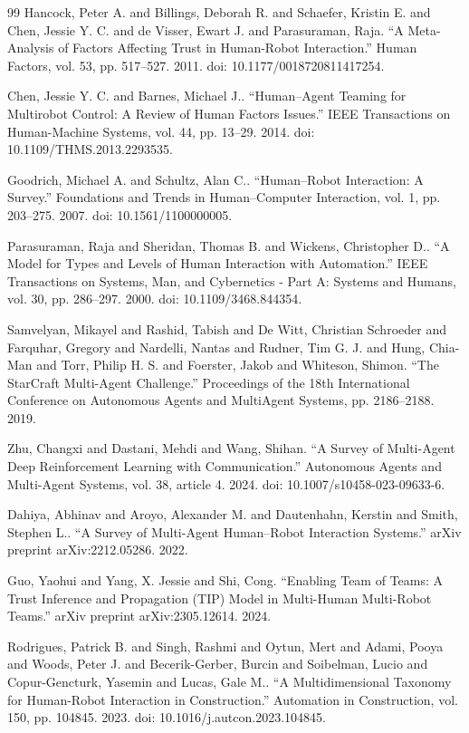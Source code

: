 \documentclass[fleqn,10pt]{wlpeerj}
\begin{document}
\begin{thebibliography}{99}
 Hancock, Peter A. and Billings, Deborah R. and Schaefer, Kristin E. and Chen, Jessie Y. C. and de Visser, Ewart J. and Parasuraman, Raja. ``A Meta-Analysis of Factors Affecting Trust in Human-Robot Interaction.'' Human Factors, vol. 53, pp. 517--527. 2011. doi: 10.1177/0018720811417254.

 Chen, Jessie Y. C. and Barnes, Michael J.. ``Human--Agent Teaming for Multirobot Control: A Review of Human Factors Issues.'' IEEE Transactions on Human-Machine Systems, vol. 44, pp. 13--29. 2014. doi: 10.1109/THMS.2013.2293535.

 Goodrich, Michael A. and Schultz, Alan C.. ``Human--Robot Interaction: A Survey.'' Foundations and Trends in Human--Computer Interaction, vol. 1, pp. 203--275. 2007. doi: 10.1561/1100000005.

 Parasuraman, Raja and Sheridan, Thomas B. and Wickens, Christopher D.. ``A Model for Types and Levels of Human Interaction with Automation.'' IEEE Transactions on Systems, Man, and Cybernetics - Part A: Systems and Humans, vol. 30, pp. 286--297. 2000. doi: 10.1109/3468.844354.

 Samvelyan, Mikayel and Rashid, Tabish and De Witt, Christian Schroeder and Farquhar, Gregory and Nardelli, Nantas and Rudner, Tim G. J. and Hung, Chia-Man and Torr, Philip H. S. and Foerster, Jakob and Whiteson, Shimon. ``The StarCraft Multi-Agent Challenge.'' Proceedings of the 18th International Conference on Autonomous Agents and MultiAgent Systems, pp. 2186--2188. 2019.

 Zhu, Changxi and Dastani, Mehdi and Wang, Shihan. ``A Survey of Multi-Agent Deep Reinforcement Learning with Communication.'' Autonomous Agents and Multi-Agent Systems, vol. 38, article 4. 2024. doi: 10.1007/s10458-023-09633-6.

 Dahiya, Abhinav and Aroyo, Alexander M. and Dautenhahn, Kerstin and Smith, Stephen L.. ``A Survey of Multi-Agent Human--Robot Interaction Systems.'' arXiv preprint arXiv:2212.05286. 2022.

 Guo, Yaohui and Yang, X. Jessie and Shi, Cong. ``Enabling Team of Teams: A Trust Inference and Propagation (TIP) Model in Multi-Human Multi-Robot Teams.'' arXiv preprint arXiv:2305.12614. 2024.

 Rodrigues, Patrick B. and Singh, Rashmi and Oytun, Mert and Adami, Pooya and Woods, Peter J. and Becerik-Gerber, Burcin and Soibelman, Lucio and Copur-Gencturk, Yasemin and Lucas, Gale M.. ``A Multidimensional Taxonomy for Human-Robot Interaction in Construction.'' Automation in Construction, vol. 150, pp. 104845. 2023. doi: 10.1016/j.autcon.2023.104845.


\end{thebibliography}
\end{document}
